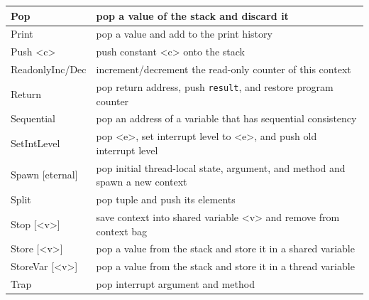 \documentclass{report}
\begin{document}
{\begin{tabular}{|l|l|}
\hline
Pop & pop a value of the stack and discard it \\
\hline
Print & pop a value and add to the print history \\
\hline
Push <{c}> & push constant <{c}> onto the stack \\
\hline
ReadonlyInc/Dec & increment/decrement the read-only counter of this context \\
\hline
Return & pop return address, push \texttt{result}, and restore program counter \\
\hline
Sequential & pop an address of a variable that has sequential consistency \\
\hline
SetIntLevel & pop <{e}>, set interrupt level to <{e}>, and push old interrupt level \\
\hline
Spawn [eternal] & pop initial thread-local state, argument, and method and spawn a new context \\
\hline
Split & pop tuple and push its elements \\
\hline
Stop [<{v}>] & save context into shared variable <{v}> and remove from context bag \\
\hline
Store [<{v}>] & pop a value from the stack and store it in a shared variable \\
\hline
StoreVar [<{v}>] & pop a value from the stack and store it in a thread variable \\
\hline
Trap & pop interrupt argument and method \\
\hline
\end{tabular}
}
\end{document}
